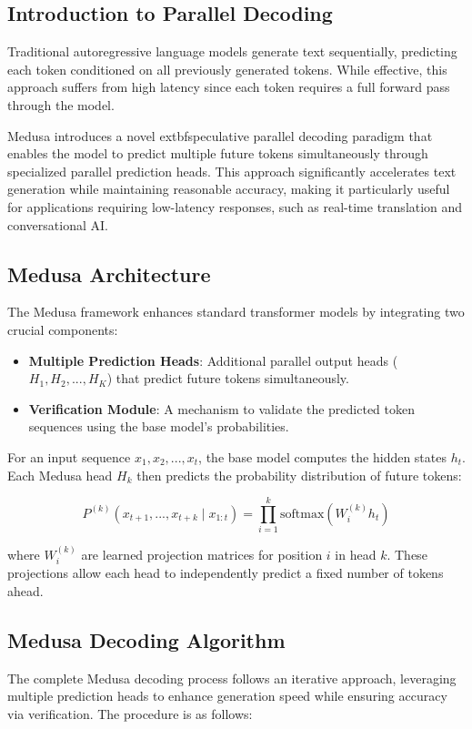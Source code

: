 \documentclass{article}
\begin{document}
\subsection{Introduction to Parallel Decoding}
Traditional autoregressive language models generate text sequentially, predicting each token conditioned on all previously generated tokens. While effective, this approach suffers from high latency since each token requires a full forward pass through the model.

Medusa introduces a novel 	extbf{speculative parallel decoding} paradigm that enables the model to predict multiple future tokens simultaneously through specialized parallel prediction heads. This approach significantly accelerates text generation while maintaining reasonable accuracy, making it particularly useful for applications requiring low-latency responses, such as real-time translation and conversational AI.

\subsection{Medusa Architecture}
The Medusa framework enhances standard transformer models by integrating two crucial components:

\begin{itemize}
    \item \textbf{Multiple Prediction Heads}: Additional parallel output heads ($H_1, H_2, ..., H_K$) that predict future tokens simultaneously.
    \item \textbf{Verification Module}: A mechanism to validate the predicted token sequences using the base model’s probabilities.
\end{itemize}

For an input sequence $x_1, x_2, ..., x_t$, the base model computes the hidden states $h_t$. Each Medusa head $H_k$ then predicts the probability distribution of future tokens:

\begin{equation}
    P^{(k)}(x_{t+1}, ..., x_{t+k} \mid x_{1:t}) = \prod_{i=1}^{k} \text{softmax}(W_i^{(k)} h_t)
\end{equation}

where $W_i^{(k)}$ are learned projection matrices for position $i$ in head $k$. These projections allow each head to independently predict a fixed number of tokens ahead.

\subsection{Medusa Decoding Algorithm}
The complete Medusa decoding process follows an iterative approach, leveraging multiple prediction heads to enhance generation speed while ensuring accuracy via verification. The procedure is as follows:
\end{document}
